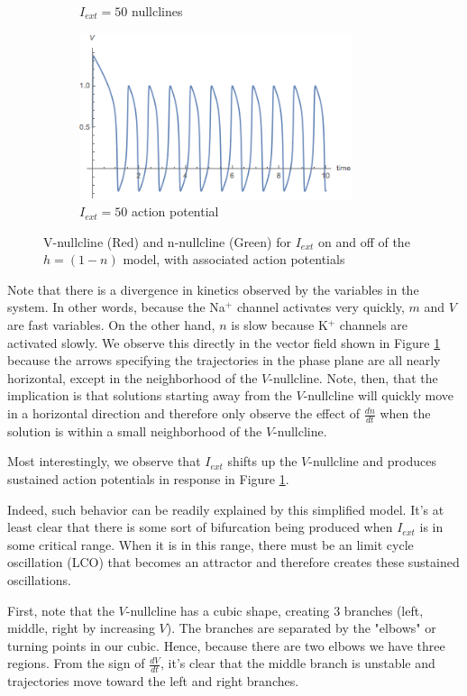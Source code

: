 \documentclass{article}
\begin{document}
\begin{figure}
\begin{subfigure}{\textwidth}
	\caption{$I_{ext}=50$ nullclines}
\end{subfigure}
\begin{subfigure}{\textwidth}
	\centering
	\includegraphics[width=8cm]{sustained_simple.png}
	\caption{$I_{ext}=50$ action potential}
\end{subfigure}
	\caption{V-nullcline (Red) and n-nullcline (Green) for $I_{ext}$ on and off of the $h=(1-n)$ model, with associated action potentials}
	\label{fig:nullc}
\end{figure}

Note that there is a divergence in kinetics observed by the variables in the system. In other words, because the Na$^+$ channel activates very quickly, $m$ and $V$ are fast variables. On the other hand, $n$ is slow because K$^+$ channels are activated slowly.\cite{keener} We observe this directly in the vector field shown in Figure \ref{fig:nullc} because the arrows specifying the trajectories in the phase plane are all nearly horizontal, except in the neighborhood of the $V$-nullcline. Note, then, that the implication is that solutions starting away from the $V$-nullcline will quickly move in a horizontal direction and therefore only observe the effect of $\frac{dn}{dt}$ when the solution is within a small neighborhood of the $V$-nullcline. 

Most interestingly, we observe that $I_{ext}$ shifts up the $V$-nullcline and produces sustained action potentials in response in Figure \ref{fig:nullc}.

Indeed, such behavior can be readily explained by this simplified model. It's at least clear that there is some sort of bifurcation being produced when $I_{ext}$ is in some critical range. When it is in this range, there must be an limit cycle oscillation (LCO) that becomes an attractor and therefore creates these sustained oscillations. 

First, note that the $V$-nullcline has a cubic shape, creating 3 branches (left, middle, right by increasing $V$). The branches are separated by the "elbows" or turning points in our cubic. Hence, because there are two elbows we have three regions. From the sign of $\frac{dV}{dt}$, it's clear that the middle branch is unstable and trajectories move toward the left and right branches.
\end{document}
